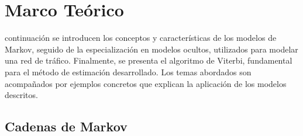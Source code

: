 \let\textcircled=\pgftextcircled
\chapter {Marco Teórico}
\label{chap:teorico}

 continuación se introducen los conceptos y características de los modelos de Markov, seguido de la especialización en modelos ocultos, utilizados para modelar una red de tráfico. Finalmente, se presenta el algoritmo de Viterbi, fundamental para el método de estimación desarrollado. Los temas abordados son acompañados por ejemplos concretos que explican la aplicación de los modelos descritos. 

\section{Cadenas de Markov}

